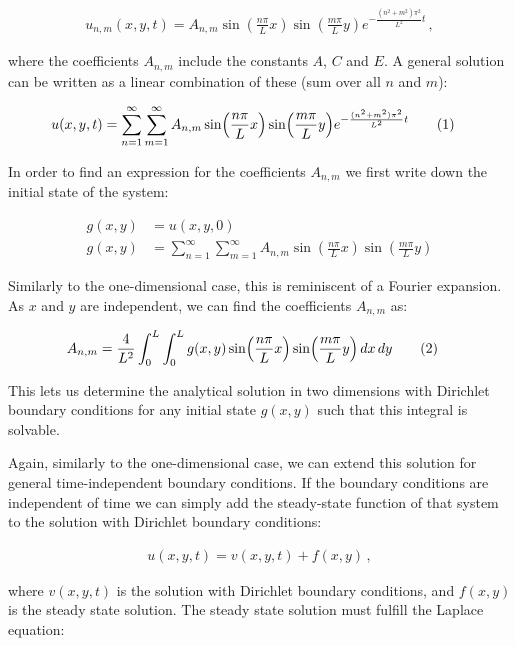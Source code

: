 \documentclass[reprint,english,notitlepage]{revtex4-1}  %
\newcommand\numberthis{\addtocounter{equation}{1}\tag{\theequation}}
\begin{document}
\begin{align*}
u_{n,m}(x,y,t) = A_{n,m} \sin (\frac{n\pi}{L} x)  \sin (\frac{m\pi}{L} y) e^{-\frac{(n^2 + m^2)\pi^2}{L^2} t} \, ,
\end{align*}

where the coefficients $A_{n,m}$ include the constants $A$, $C$ and $E$. A general solution can be written as a linear combination of these (sum over all $n$ and $m$):

\begin{align*}
u(x,y,t) &= \sum\limits_{n=1}^\infty \sum\limits_{m=1}^\infty A_{n,m} \sin (\frac{n\pi}{L} x)  \sin (\frac{m\pi}{L} y) e^{-\frac{(n^2 + m^2)\pi^2}{L^2} t} \numberthis \label{eq:2D_diffusion_equation_analytical_solution}
\end{align*} 

In order to find an expression for the coefficients $A_{n,m}$ we first write down the initial state of the system:

\begin{align*}
g(x,y) &= u(x,y,0) \\
g(x,y) &= \sum\limits_{n=1}^\infty \sum\limits_{m=1}^\infty A_{n,m} \sin (\frac{n\pi}{L} x)  \sin (\frac{m\pi}{L} y)
\end{align*}

Similarly to the one-dimensional case, this is reminiscent of a Fourier expansion. As $x$ and $y$ are independent, we can find the coefficients $A_{n,m}$ as:

\begin{align*}
A_{n,m} &= \frac{4}{L^2} \int_0^L \int_0^L g(x,y) \sin( \frac{n\pi}{L} x) \sin (\frac{m\pi}{L} y) \, dx \, dy \numberthis \label{eq:2D_diffusion_equation_analytical_coefficients}
\end{align*}

This lets us determine the analytical solution in two dimensions with Dirichlet boundary conditions for any initial state $g(x,y)$ such that this integral is solvable.

Again, similarly to the one-dimensional case, we can extend this solution for general time-independent boundary conditions. If the boundary conditions are independent of time we can simply add the steady-state function of that system to the solution with Dirichlet boundary conditions:

\begin{align*}
u(x,y,t) = v(x,y,t) + f(x,y) \, ,
\end{align*}

where $v(x,y,t)$ is the solution with Dirichlet boundary conditions, and $f(x,y)$ is the steady state solution. The steady state solution must fulfill the Laplace equation:
\end{document}
